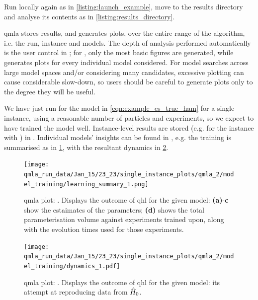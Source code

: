 Run locally again as in \cref{listing:launch_example}, move to the results directory and analyse its contents as in \cref{listing:results_directory}. 
\par 
\gls{qmla} stores results, and generates plots, 
    over the entire range of the algorithm, i.e. the \gls{run}\footnotemark, \gls{instance} and models. 
The depth of analysis performed automatically is the user control  in ;
    for , only the most basic figures are generated, while  generates plots for every individual 
    model considered. 
For model searches across large model spaces and/or considering many candidates,
    excessive plotting can cause considerable slow-down, so users should be careful to generate plots only 
    to the degree they will be useful. 
\par 

We have just run  for the model in \cref{eqn:example_es_true_ham} for a single instance, 
    using a reasonable number of particles and experiments, so we expect to have trained the model well. 
Instance-level results are stored (e.g. for the instance with ) in .
Individual models' insights can be found in , 
    e.g. the training is summarised as in \cref{fig:qmla_learning_summary}, with the resultant dynamics in \cref{fig:qmla_model_dynamics}.
\par 
\begin{figure}
    \begin{center}
        \texttt{[image: qmla\_run\_data/Jan\_15/23\_23/single\_instance\_plots/qmla\_2/model\_training/learning\_summary\_1.png]}
    \end{center}
    \caption[ \gls{qmla} plot: learning\_summary]{
        \gls{qmla} plot: . 
        Displays the outcome of \gls{qhl} for the given model:
        \textbf{(a)}-\textbf{c} show the estaimates of the parameters; 
        \textbf{(d)} shows the total parameterisation volume against experiments trained upon, 
        along with the evolution times used for those experiments. 
    }
    \label{fig:qmla_learning_summary}
\end{figure}
\begin{figure}
    \begin{center}
        \texttt{[image: qmla\_run\_data/Jan\_15/23\_23/single\_instance\_plots/qmla\_2/model\_training/dynamics\_1.pdf]}
    \end{center}
    \caption[ \gls{qmla} plot: dynamics]{
        \gls{qmla} plot: . 
        Displays the outcome of \gls{qhl} for the given model:
        its attempt at reproducing data from $\hat{H}_0$. 
    }
    \label{fig:qmla_model_dynamics}
\end{figure}

